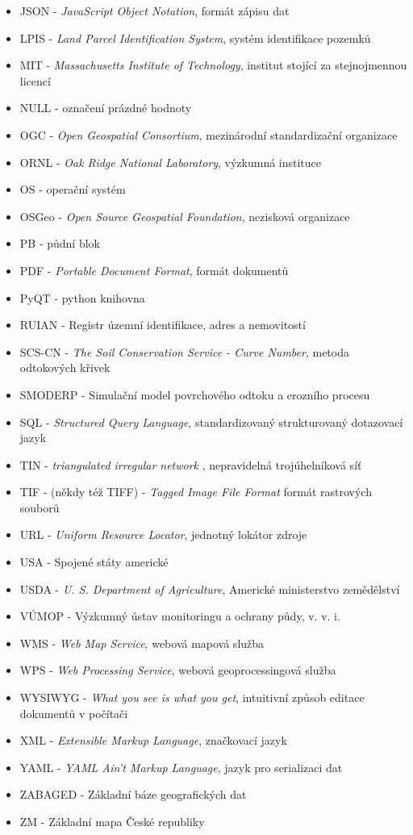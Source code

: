 \documentclass[a4paper,oneside,12pt]{book}
\begin{document}
\begin{itemize}
  \item JSON - \textit{JavaScript Object Notation}, formát zápisu dat
  \item LPIS - \textit{Land Parcel Identification System}, systém identifikace pozemků
  \item MIT - \textit{Massachusetts Institute of Technology}, institut stojící za stejnojmennou licencí
  \item NULL - označení prázdné hodnoty
  \item OGC - \textit{Open Geospatial Consortium}, mezinárodní standardizační organizace 
  \item ORNL - \textit{Oak Ridge National Laboratory}, výzkumná instituce
  \item OS - operační systém
  \item OSGeo - \textit{Open Source Geospatial Foundation}, nezisková organizace
  \item PB - půdní blok
  \item PDF - \textit{Portable Document Format}, formát dokumentů
  \item PyQT - python knihovna 
  \item RUIAN - Registr územní identifikace, adres a nemovitostí
  \item SCS-CN - \textit{The Soil Conservation Service - Curve Number}, metoda odtokových křivek
  \item SMODERP - Simulační model povrchového odtoku a erozního procesu
  \item SQL - \textit{Structured Query Language}, standardizovaný strukturovaný dotazovací jazyk
  \item TIN - \textit{ triangulated irregular network }, nepravidelná trojúhelníková síť
  \item TIF - (někdy též TIFF) - \textit{Tagged Image File Format} formát rastrových souborů
  \item URL - \textit{Uniform Resource Locator}, jednotný lokátor zdroje
  \item USA - Spojené státy americké
  \item USDA - \textit{U. S. Department of Agriculture}, Americké ministerstvo zemědělství
  \item VÚMOP - Výzkumný ústav monitoringu a ochrany půdy, v. v. i.
  \item WMS - \textit{Web Map Service}, webová mapová služba
  \item WPS - \textit{Web Processing Service}, webová geoprocessingová služba
  \item WYSIWYG - \textit{What you see is what you get}, intuitivní způsob editace dokumentů v počítači
  \item XML - \textit{Extensible Markup Language}, značkovací jazyk
  \item YAML - \textit{YAML Ain't Markup Language}, jazyk pro serializaci dat
  \item ZABAGED - Základní báze geografických dat
  \item ZM - Základní mapa České republiky 
 \end{itemize}
\end{document}
